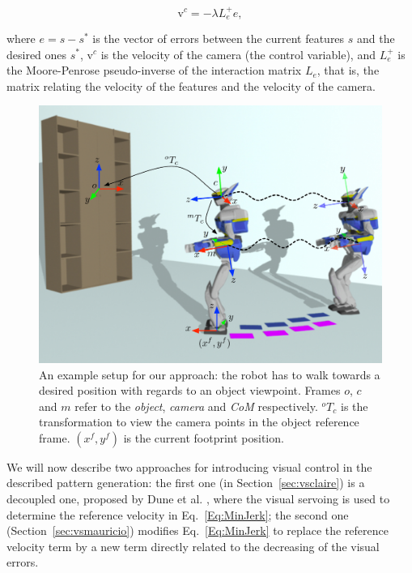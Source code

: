 $$
\text{v}^c = -\lambda {L}_e^{+} {e},
$$

\noindent where ${e} = {s}-{s}^{*}$ is the vector of errors between the current features $s$ and the desired ones ${s}^{*}$, $\text{{v}}^c$ is the velocity of the camera (the control variable), and ${L}_e^{+}$ is the Moore-Penrose pseudo-inverse of the interaction matrix ${L}_e$, that is, the matrix relating the velocity of the features and the velocity of the camera.

\begin{figure}[ht] 
\begin{center}
\includegraphics[scale=0.5]{Chap4-Visual-Servoing/schema_new.pdf} 
\caption{ An example setup for our approach: the robot has to walk towards a desired position with regards to an object viewpoint. Frames $o$, $c$ and $m$ refer to the {\it object}, {\it camera} and {\it CoM} respectively. $^o {T}_c$ is the transformation to view the camera points in the object reference frame. $(x^f, y^f)$ is the current footprint position.} 
\label{Fig:Schema}
\end{center}
\end{figure}

We will now describe two approaches for introducing visual control in the described pattern generation: the first one (in Section~\ref{sec:vsclaire}) is a decoupled one, proposed by Dune et al. \citep{DuneIROS2010}, where the visual servoing is used to determine the reference velocity in Eq.~\ref{Eq:MinJerk}; the second one (Section~\ref{sec:vsmauricio}) modifies Eq.~\ref{Eq:MinJerk} to replace the reference velocity term by a new term directly related to the decreasing of the visual errors.


